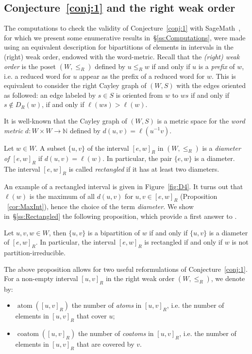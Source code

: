 \documentclass[ALCO,Unicode]{cedram}
\theoremstyle{definition}
\newcommand{\coatom}{\operatorname{coatom}}
\newcommand{\atom}{\operatorname{atom}}
\begin{document}
\subsection{Conjecture~\ref{conj:1} and the right weak order}\label{ss:Weak}   The computations to check the validity of Conjecture~\ref{conj:1} with SageMath~\cite{sage}, for which we present some enumerative results in~\S\ref{ss:Computations},  were made using an equivalent description for bipartitions of elements  in intervals in the (right) weak order, endowed with the word-metric. Recall that the {\em (right) weak order} is the poset $(W,\leq_R)$  defined by $u\leq_R w$ if and only if $u$ is a {\em prefix} of $w$, i.e. a reduced word for $u$ appear as the prefix of a reduced word for $w$. This is equivalent to consider the right Cayley graph of $(W,S)$ with the edges oriented as followed: an edge labeled by $s\in S$ is oriented from $w$ to $ws$ if and only if $s\notin D_R(w)$, if and only if $\ell(ws)>\ell(w)$. 

It is well-known that the Cayley graph of $(W,S)$ is a metric space for the {\em word metric} $d:W\times W\to \mathbb N$ defined by  $d(u,v)=\ell(u^{-1}v)$. 

\begin{defi}\label{def:2} Let $w\in W$. A subset $\{u,v\}$ of the interval  $[e,w]_R$ in $(W,\leq_R)$ is a {\em diameter of  $[e,w]_R$} if $d(u,v)=\ell(w)$. In particular, the pair $\{e,w\}$ is a diameter. The interval $[e,w]_R$ is called {\em rectangled} if it has at least two diameters. 
\end{defi}

An example of a rectangled interval is given in Figure~\ref{fig:D4}. It turns out that $\ell(w)$ is the maximum of all $d(u,v)$ for $u,v\in [e,w]_R$ (Proposition ~\ref{cor:MaxInt}),  hence the choice of the term {\em diameter}. We show in~\S\ref{ss:Rectangled} the following proposition, which provide a first answer to  \cite[Question~6]{DiRo09}.

\begin{prop}\label{prop:rectangled} Let  $u,v,w\in W$, then $\{u,v\}$ is a bipartition of $w$ if and only if $\{u,v\}$ is a diameter of $[e,w]_R$. In particular, the interval $[e,w]_R$ is rectangled if and only if $w$ is not partition-irreducible.
\end{prop}

The above proposition allows for two useful reformulations of Conjecture~\ref{conj:1}.  For a non-empty interval $[u,v]_R$ in the right weak order $(W,\leq_R)$, we denote by:
\begin{itemize}
\item $\atom([u,v]_R)$ the number of  {\em atoms} in $[u,v]_R$, i.e. the number of elements in $[u,v]_R$ that cover  $u$; 
\item $\coatom([u,v]_R)$ the number of  {\em coatoms} in $[u,v]_R$, i.e. the number of elements in $[u,v]_R$ that are covered by $v$.
\end{itemize}
\end{document}
